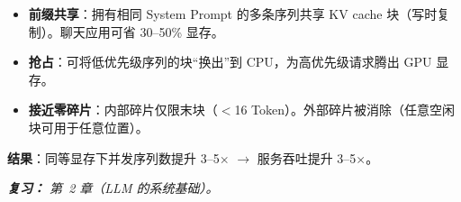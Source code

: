 \begin{questionbox}
\begin{itemize}
  \item \textbf{前缀共享}：拥有相同 System Prompt 的多条序列共享 KV cache 块（写时复制）。聊天应用可省 30--50\% 显存。
  \item \textbf{抢占}：可将低优先级序列的块“换出”到 CPU，为高优先级请求腾出 GPU 显存。
  \item \textbf{接近零碎片}：内部碎片仅限末块（$<$16 Token）。外部碎片被消除（任意空闲块可用于任意位置）。
\end{itemize}

\textbf{结果}：同等显存下并发序列数提升 3--5$\times$ $\rightarrow$ 服务吞吐提升 3--5$\times$。

\emph{\textbf{复习：} 第~2 章（LLM 的系统基础）。}
\end{questionbox}

